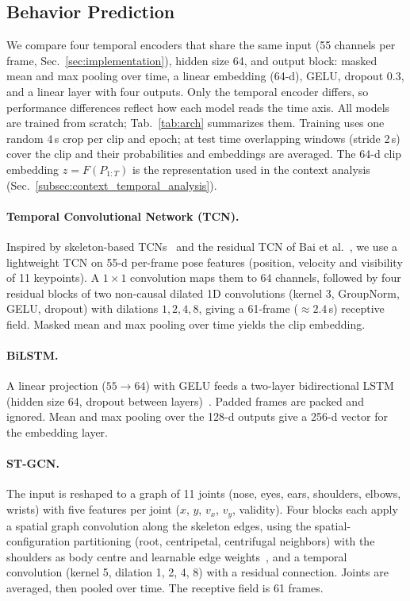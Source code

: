 \documentclass[10pt,twocolumn,letterpaper]{article}
\begin{document}
\subsection{Behavior Prediction}
\label{subsec:behavior_prediction}
We compare four temporal encoders that share the same input (55 channels per frame, Sec.~\ref{sec:implementation}), hidden size 64, and output block: masked mean and max pooling over time, a linear embedding (64-d), GELU, dropout 0.3, and a linear layer with four outputs. Only the temporal encoder differs, so performance differences reflect how each model reads the time axis. All models are trained from scratch; Tab.~\ref{tab:arch} summarizes them. Training uses one random 4\,s crop per clip and epoch; at test time overlapping windows (stride 2\,s) cover the clip and their probabilities and embeddings are averaged. The 64-d clip embedding $z=F(P_{1:T})$ is the representation used in the context analysis (Sec.~\ref{subsec:context_temporal_analysis}).


\paragraph{Temporal Convolutional Network (TCN).}
Inspired by skeleton-based TCNs~\cite{nan2021comparison,Kim_2017_CVPR_Workshops} and
the residual TCN of Bai et al.~\cite{bai1803empirical}, we use a lightweight TCN on 55-d per-frame pose features (position, velocity and visibility of 11 keypoints). A $1\times1$ convolution maps them to 64 channels, followed by four residual blocks of two non-causal dilated 1D convolutions (kernel 3,
GroupNorm, GELU, dropout) with dilations $1,2,4,8$, giving a 61-frame ($\approx 2.4$\,s) receptive field. Masked mean and max pooling over time yields the clip embedding.

\paragraph{BiLSTM.}
A linear projection ($55{\to}64$) with GELU feeds a two-layer bidirectional LSTM (hidden size 64, dropout between layers)~\cite{KEY_lstm}. Padded frames are packed and ignored. Mean and max pooling over the 128-d outputs give a 256-d vector for the embedding layer.

\paragraph{ST-GCN.}
The input is reshaped to a graph of 11 joints (nose, eyes, ears, shoulders, elbows, wrists) with five features per joint ($x$, $y$, $v_x$, $v_y$, validity). Four blocks each apply a spatial graph convolution along the skeleton edges, using the spatial-configuration partitioning (root, centripetal, centrifugal neighbors) with the shoulders as body centre and learnable edge weights~\cite{KEY_stgcn}, and a temporal convolution (kernel 5, dilation 1, 2, 4, 8) with a residual connection. Joints are averaged, then pooled over time. The receptive field is 61 frames.
\end{document}

